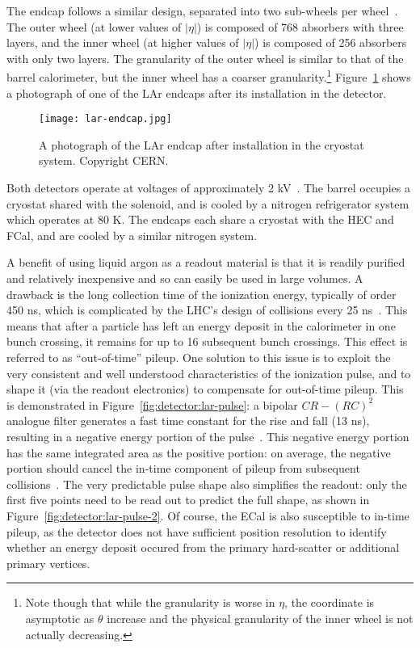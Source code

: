 


The endcap follows a similar design, separated into two sub-wheels per wheel~\cite{ATLASPaper}. The outer wheel (at lower values of $|\eta|$) is composed of 768 absorbers with three layers, and the inner wheel (at higher values of $|\eta|$) is composed of 256 absorbers with only two layers. The granularity of the outer wheel is similar to that of the barrel calorimeter, but the inner wheel has a coarser granularity.\footnote{Note though that while the granularity is worse in $\eta$, the coordinate is asymptotic as $\theta$ increase and the physical granularity of the inner wheel is not actually decreasing.} Figure~\ref{fig:detector:lar-endcap} shows a photograph of one of the LAr endcaps after its installation in the detector.



\begin{figure}
\centering
\texttt{[image: lar-endcap.jpg]}
\caption{A photograph of the LAr endcap after installation in the cryostat system. Copyright CERN.}
\label{fig:detector:lar-endcap}
\end{figure}


Both detectors operate at voltages of approximately 2 kV~\cite{ATLASPaper}. The barrel occupies a cryostat shared with the solenoid, and is cooled by a nitrogen refrigerator system which operates at 80 K. The endcaps each share a cryostat with the HEC and FCal, and are cooled by a similar nitrogen system.

A benefit of using liquid argon as a readout material is that it is readily purified and relatively inexpensive and so can easily be used in large volumes. A drawback is the long collection time of the ionization energy, typically of order 450 ns, which is complicated by the LHC's design of collisions every 25 ns~\cite{ATLASPaper,LARPaper}. This means that after a particle has left an energy deposit in the calorimeter in one bunch crossing, it remains for up to 16 subsequent bunch crossings. This effect is referred to as ``out-of-time'' pileup. One solution to this issue is to exploit the very consistent and well understood characteristics of the ionization pulse, and to shape it (via the readout electronics) to compensate for out-of-time pileup. This is demonstrated in Figure~\ref{fig:detector:lar-pulse}: a bipolar $CR -(RC)^2$ analogue filter generates a fast time constant for the rise and fall (13 ns), resulting in a negative energy portion of the pulse~\cite{LARPaper}. This negative energy portion has the same integrated area as the positive portion: on average, the negative portion should cancel the in-time component of pileup from subsequent collisions~\cite{Loch}. The very predictable pulse shape also simplifies the readout: only the first five points need to be read out to predict the full shape, as shown in Figure~\ref{fig:detector:lar-pulse-2}. Of course, the ECal is also susceptible to in-time pileup, as the detector does not have sufficient position resolution to identify whether an energy deposit occured from the primary hard-scatter or additional primary vertices.

